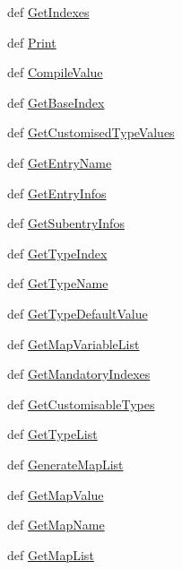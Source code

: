 \begin{CompactItemize}
\item 
def \hyperlink{classnode_1_1Node_2c13cc6017f11586d2d468dfc13eea3f}{Get\-Indexes}
\item 
def \hyperlink{classnode_1_1Node_eea414ed028d0c7394b2a3d2e074dc6c}{Print}
\item 
def \hyperlink{classnode_1_1Node_568c905bc501afe4b6e629aa1fb75422}{Compile\-Value}
\item 
def \hyperlink{classnode_1_1Node_5d684b6a3fc90c5b0717dc3ade76e5ad}{Get\-Base\-Index}
\item 
def \hyperlink{classnode_1_1Node_c21f753bedba1302086de038bf21fda8}{Get\-Customised\-Type\-Values}
\item 
def \hyperlink{classnode_1_1Node_9580efd7d474b782904670d7a5b9bb22}{Get\-Entry\-Name}
\item 
def \hyperlink{classnode_1_1Node_ca8f7294684dc241193f0a7482ca240b}{Get\-Entry\-Infos}
\item 
def \hyperlink{classnode_1_1Node_af7e760ac825aa5611d2c08cbf572261}{Get\-Subentry\-Infos}
\item 
def \hyperlink{classnode_1_1Node_745867283d1ca5d81e67e7d0704cf0c1}{Get\-Type\-Index}
\item 
def \hyperlink{classnode_1_1Node_d44071dce04af279a723354b20b02602}{Get\-Type\-Name}
\item 
def \hyperlink{classnode_1_1Node_7d876e328f58d315357d0da9525bd64a}{Get\-Type\-Default\-Value}
\item 
def \hyperlink{classnode_1_1Node_494cd12b234273d9c2f0a428defe0028}{Get\-Map\-Variable\-List}
\item 
def \hyperlink{classnode_1_1Node_6630247aaffdec3448b81c294c5d69e5}{Get\-Mandatory\-Indexes}
\item 
def \hyperlink{classnode_1_1Node_7495e3fdf396ee2ab1f7472c9682d007}{Get\-Customisable\-Types}
\item 
def \hyperlink{classnode_1_1Node_d8158864eb6cd18998f9d9d302b37780}{Get\-Type\-List}
\item 
def \hyperlink{classnode_1_1Node_c288a6a6ed8ac92aa09d50d926f9715d}{Generate\-Map\-List}
\item 
def \hyperlink{classnode_1_1Node_375969d6edbee5a276b215498a4e6f6c}{Get\-Map\-Value}
\item 
def \hyperlink{classnode_1_1Node_df42241bdf3a60d71a6e946b20efb4d8}{Get\-Map\-Name}
\item 
def \hyperlink{classnode_1_1Node_7531642c9fff692807ae7389474089aa}{Get\-Map\-List}
\end{CompactItemize}
